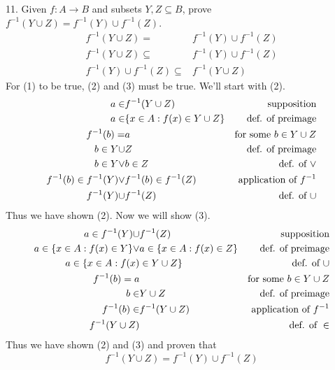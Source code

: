 \documentclass{article}
\begin{document}
\begin{exercise}{}{}
	{11. Given $f: A \rightarrow B$ and subsets $Y, Z \subseteq B$, prove
		$f^{-1}(Y \cup Z)=f^{-1}(Y) \cup f^{-1}(Z)$.}
	\setcounter{equation}{0}
	\begin{align}
		f^{-1}(Y \cup Z)=                  & f^{-1}(Y) \cup f^{-1}(Z) \\
		f^{-1}(Y \cup Z)\subseteq          & f^{-1}(Y) \cup f^{-1}(Z) \\
		f^{-1}(Y) \cup f^{-1}(Z) \subseteq & f^{-1}(Y \cup Z)
	\end{align}
	For (1) to be true, (2) and (3) must be true. We'll start with (2).
	\begin{align}
		a\in                         & f^{-1}(Y\cup Z)                 & \text{supposition}           \\
		a\in                         & \{x \in A: f(x) \in Y\cup Z\} & \text{def. of preimage}      \\
		f^{-1}(b) =                  & a                               & \text{for some }b\in Y\cup Z \\
		b \in Y \cup                 & Z                               & \text{def. of preimage}      \\
		b \in Y \lor                 & b \in Z                         & \text{def. of }\lor          \\
		f^{-1}(b) \in f^{-1}(Y) \lor & f^{-1}(b) \in f^{-1}(Z)         & \text{application of }f^{-1} \\
		f^{-1}(Y) \cup               & f^{-1}(Z)                       & \text{def. of }\cup
	\end{align}
	Thus we have shown (2). Now we will show (3).
	\begin{align}
		a\in f^{-1}(Y) \cup                 & f^{-1}(Z)                      & \text{supposition}           \\
		a\in \{x \in A: f(x) \in Y\} \lor & a\in \{x \in A: f(x) \in Z\} & \text{def. of preimage}      \\
		a\in \{x \in A: f(x)             & \in Y\cup Z\}                   & \text{def. of }\cup          \\
		f^{-1}(b) = a                       &                                & \text{for some }b\in Y\cup Z \\
		b \in                               & Y \cup Z                       & \text{def. of preimage}      \\
		f^{-1}(b) \in                       & f^{-1}(Y\cup Z)                & \text{application of }f^{-1} \\
		f^{-1}(Y\cup Z)                     &                                & \text{def. of }\in
	\end{align}
	Thus we have shown (2) and (3) and proven that
	\[
		f^{-1}(Y \cup Z)=f^{-1}(Y) \cup f^{-1}(Z)
	\]
\end{exercise}{}{}
\end{document}
